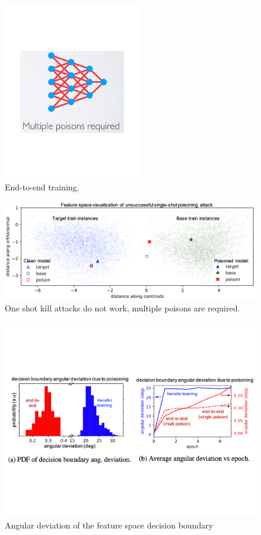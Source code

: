 \documentclass[11pt]{article}
\numberwithin{equation}{section}
\begin{document}
\begin{figure}[!h]
	\centering
	\includegraphics[width=6cm]{figures/end2end.pdf}
	\caption{End-to-end training.}
	\label{fig:P_misclassify}
\end{figure}

\begin{figure}[H]
	\centering
	\includegraphics[width=15cm]{figures/end2end_distribute.png}
	\caption{One shot kill attacks do not work, multiple poisons are required. \color{red}{Feature layers learn to separate poison from target in feature space.}}
	\label{fig:end2end_distribute}
\end{figure}

\begin{figure}[!h]
	\centering
	\includegraphics[width=14cm]{figures/Angular.pdf}
	\caption{Angular deviation of the feature space decision boundary}
	\label{fig:P_misclassify}
\end{figure}
\end{document}
